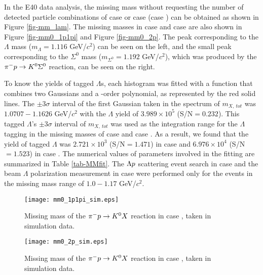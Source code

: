 In the E40 data analysis, the missing mass without requesting the number of detected particle combinations of case  or case  (case ) can be obtained as shown in Figure \ref{fig-mm_lam}. The missing masses in case  and case  are also shown in Figure \ref{fig-mm0_1p1pi} and Figure \ref{fig-mm0_2p}. The peak corresponding to the $\Lambda$ mass ($m_{\Lambda} = 1.116$ GeV/$c^{2}$) can be seen on the left, and the small peak corresponding to the $\Sigma^{0}$ mass ($m_{\Sigma^{0}} = 1.192$ GeV/$c^{2}$), which was produced by the $\pi^{-}p \to K^{0}\Sigma^{0}$ reaction, can be seen on the right. 

To know the yields of tagged $\Lambda$s, each histogram was fitted with a function that combines two Gaussians and a -order polynomial, as represented by the red solid lines. The $\pm3\sigma$ interval of the first Gaussian taken in the spectrum of $m_{X,\ tot}$ was $1.0707 - 1.1626$ GeV/$c^{2}$ with the $\Lambda$ yield of $3.989\times10^{5}$ (S/N$=0.232$). This tagged $\Lambda$'s $\pm3\sigma$ interval of $m_{X,\ tot}$ was used as the integration range for the $\Lambda$ tagging in the missing masses of case  and case . As a result, we found that the yield of tagged $\Lambda$ was $2.721\times10^{3}$ (S/N$=1.471$) in case  and $6.976\times10^{4}$ (S/N$=1.523$) in case . The numerical values of parameters involved in the fitting are summarized in Table \ref{tab-MMfit}. The $\Lambda p$ scattering event search in case  and the beam $\Lambda$ polarization measurement in case  were performed only for the events in the missing mass range of $1.0 - 1.17$ GeV/$c^{2}$.


\begin{figure}[!h]
  \begin{center}
    \texttt{[image: mm0\_1p1pi\_sim.eps]}
    \caption{Missing mass of the $\pi^- p \to K^0 X$ reaction in case , taken in simulation data.}
    \label{fig-mm0_1p1pi_sim}
  \end{center}
\end{figure}

\begin{figure}[!h]
  \begin{center}
    \texttt{[image: mm0\_2p\_sim.eps]}
    \caption{Missing mass of the $\pi^- p \to K^0 X$ reaction in case , taken in simulation data.}
    \label{fig-mm0_2p_sim}
  \end{center}
\end{figure}

